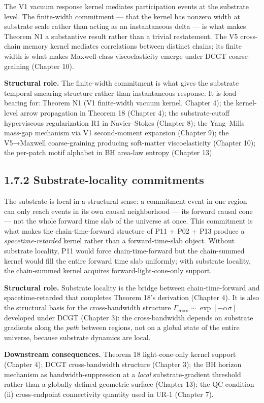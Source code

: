 \documentclass[11pt]{book}
\begin{document}
The V1 vacuum response kernel mediates participation events at the substrate level. The finite-width commitment — that the kernel has nonzero width at substrate scale rather than acting as an instantaneous delta — is what makes Theorem N1 a substantive result rather than a trivial restatement. The V5 cross-chain memory kernel mediates correlations between distinct chains; its finite width is what makes Maxwell-class viscoelasticity emerge under DCGT coarse-graining (Chapter 10).

\textbf{Structural role.} The finite-width commitment is what gives the substrate temporal smearing structure rather than instantaneous response. It is load-bearing for: Theorem N1 (V1 finite-width vacuum kernel, Chapter 4); the kernel-level arrow propagation in Theorem 18 (Chapter 4); the substrate-cutoff hyperviscous regularization R1 in Navier–Stokes (Chapter 8); the Yang–Mills mass-gap mechanism via V1 second-moment expansion (Chapter 9); the V5→Maxwell coarse-graining producing soft-matter viscoelasticity (Chapter 10); the per-patch motif alphabet in BH area-law entropy (Chapter 13).

\subsection{1.7.2 Substrate-locality commitments}

The substrate is local in a structural sense: a commitment event in one region can only reach events in its own causal neighborhood — its forward causal cone — not the whole forward time slab of the universe at once. This commitment is what makes the chain-time-forward structure of P11 + P02 + P13 produce a \textit{spacetime-retarded} kernel rather than a forward-time-slab object. Without substrate locality, P11 would force chain-time-forward but the chain-summed kernel would fill the entire forward time slab uniformly; with substrate locality, the chain-summed kernel acquires forward-light-cone-only support.

\textbf{Structural role.} Substrate locality is the bridge between chain-time-forward and spacetime-retarded that completes Theorem 18's derivation (Chapter 4). It is also the structural basis for the cross-bandwidth structure $\Gamma_\mathrm{cross} \sim \exp[-\alpha\sigma]$ developed under DCGT (Chapter 3): the cross-bandwidth depends on substrate gradients along the \textit{path} between regions, not on a global state of the entire universe, because substrate dynamics are local.

\textbf{Downstream consequences.} Theorem 18 light-cone-only kernel support (Chapter 4); DCGT cross-bandwidth structure (Chapter 3); the BH horizon mechanism as bandwidth-suppression at a \textit{local} substrate-gradient threshold rather than a globally-defined geometric surface (Chapter 13); the QC condition (ii) cross-endpoint connectivity quantity used in UR-1 (Chapter 7).
\end{document}
